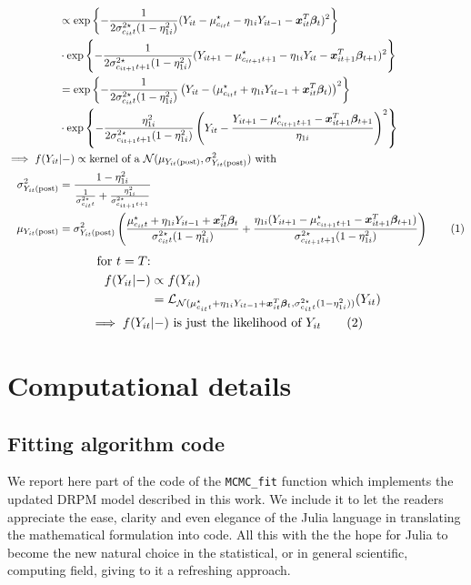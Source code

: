 \documentclass[12pt,	%
	a4paper,		%
	twoside,		%
	openright,		%
	titlepage,%
	]{book}
\theoremstyle{definition}
\newcommand{\mjline}[1]{\texttt{#1}}
\begin{document}
\begin{itemize}
\begin{align*}
 & \propto \expp{-\frac{1}{2\sigma^{2\star}_{c_{it}t}(1-\eta_{1i}^2)}(Y_{it}-\mu^\star_{c_{it}t} - \eta_{1i}Y_{it-1} - \vec{x}_{it}^T\vec{\beta}_t)^2} \\ & \cdot \expp{-\frac{1}{2\sigma^{2\star}_{c_{it+1}t+1}(1-\eta_{1i}^2)}(Y_{it+1}-\mu^\star_{c_{it+1}t+1} - \eta_{1i}Y_{it} - \vec{x}_{it+1}^T\vec{\beta}_{t+1})^2} \\ 
 & = \expp{-\frac{1}{2\sigma^{2\star}_{c_{it}t}(1-\eta_{1i}^2)}\left( Y_{it}-(\mu^\star_{c_{it}t} + \eta_{1i}Y_{it-1} + \vec{x}_{it}^T\vec{\beta}_t) \right)^2} \\ & \cdot \expp{-\frac{\eta_{1i}^2}{2\sigma^{2\star}_{c_{it+1}t+1}(1-\eta_{1i}^2)}\left( Y_{it} - \frac{Y_{it+1}-\mu^\star_{c_{it+1}t+1} - \vec{x}_{it+1}^T\vec{\beta}_{t+1}}{\eta_{1i}}\right)^2} \\
%
 \implies f(Y_{it}&|-)\propto \text{kernel of a $\N(\mu_{\postp{Y_{it}}},\sigma^2_{\postp{Y_{it}}})$ with}\\
\sigma^2_{\postp{Y_{it}}}&= \frac{1-\eta_{1i}^2}{\frac{1}{\sigma^{2\star}_{c_{it}t}} + \frac{\eta_{1i}^2}{\sigma^{2\star}_{c_{it+1}t+1}}}\\
\mu_{\postp{Y_{it}}}&=  \sigma^2_{\postp{Y_{it}}} \left( \frac{\mu^\star_{c_{it}t} + \eta_{1i}Y_{it-1} 
 + \vec{x}_{it}^T\vec{\beta}_t}{\sigma^{2\star}_{c_{it}t}(1-\eta_{1i}^2)} + \frac{\eta_{1i}(Y_{it+1}-\mu^\star_{c_{it+1}t+1} - \vec{x}_{it+1}^T\vec{\beta}_{t+1})}{\sigma^{2\star}_{c_{it+1}t+1}(1-\eta_{1i}^2)} \right)
\tag{\stepcounter{equation}\theequation}
\end{align*}
\begin{align*}
\text{for $t=T$:}&\\ 
  f(Y_{it} |- ) & \propto  f(Y_{it})\\
  &= \law_{\mathcal{N}(\mu_{c_{it}t}^\star+\eta_{1i}Y_{it-1} + \vec{x}_{it}^T\vec{\beta}_t,\sigma^{2\star}_{c_{it}t}(1-\eta_{1i}^2))}(Y_{it}) \\
   \implies f(Y_{it}&|-)\text{ is just the likelihood of $Y_{it}$}
\tag{\stepcounter{equation}\theequation}
\end{align*}


\end{itemize}



\chapter{Computational details}
\label{app: computational details}


\section{Fitting algorithm code}
We report here part of the code of the \mjline{MCMC_fit} function which implements the updated DRPM model described in this work. We include it to let the readers appreciate the ease, clarity and even elegance of the Julia language in translating the mathematical formulation into code. 
All this with the the hope for Julia to become the new natural choice in the statistical, or in general scientific, computing field, giving to it a refreshing approach.
\end{document}
